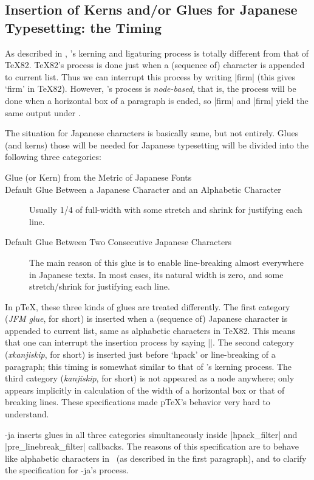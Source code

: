 \documentclass{ajt}
\begin{document}
\subsection{Insertion of Kerns and/or Glues for Japanese Typesetting: the Timing}
\label{ssec-jglue}

As described in \cite{luatexref}, \LuaTeX's kerning and ligaturing
process is totally different from that of \TeX82.
\TeX82's process is done just when a (sequence of) character is appended
to current list. Thus we can interrupt this process by writing |f{}irm|
(this gives `f\hbox{}irm' in \TeX82). However, \LuaTeX's process is
\emph{node-based}, that is, the process will be done when a horizontal
box of a paragraph is ended, so |f{}irm| and |firm| yield the same
output under \LuaTeX.

The situation for Japanese characters is basically same, but not
entirely.  Glues (and kerns) those will be needed for Japanese
typesetting will be divided into the following three categories:
\begin{description}
\item[Glue (or Kern) from the Metric of Japanese Fonts] 
\item[Default Glue Between a Japanese Character and an Alphabetic Character] 
Usually 1/4 of full-width with some stretch and shrink for justifying
	   each line.
\item[Default Glue Between Two Consecutive Japanese Characters] 
The main reason of this glue is to enable line-breaking almost
	   everywhere in Japanese texts. In most cases, its natural
	   width is zero, and
some stretch/shrink for justifying each line. 
\end{description}
In p\TeX, these three kinds of glues are treated differently. The first
 category (\emph{JFM glue}, for short) is inserted when a (sequence of)
 Japanese character is appended to current list, same as alphabetic
 characters in \TeX82. This means that one can interrupt the insertion
 process by saying |{}|.  The second category (\emph{xkanjiskip}, for
 short) is inserted just before `hpack' or line-breaking of a paragraph;
 this timing is somewhat similar to that of \LuaTeX's kerning
 process. The third category (\emph{kanjiskip}, for short) is not
 appeared as a node anywhere; only appears implicitly in calculation of
 the width of a horizontal box or that of breaking lines. These
 specifications made p\TeX's behavior very hard to understand.

\LuaTeX-ja inserts glues in all three categories simultaneously inside
|hpack_filter| and |pre_linebreak_filter| callbacks.  The reasons of
this specification are to behave like alphabetic characters in \LuaTeX\
(as described in the first paragraph), and to clarify the specification
for \LuaTeX-ja's process.
\end{document}
